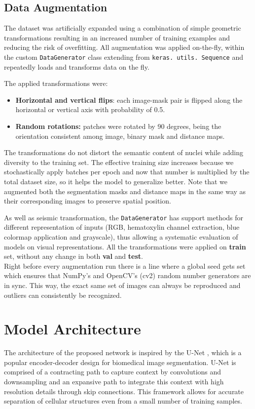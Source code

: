 \documentclass[target=bach,aauheader=,style=]{thud}
\begin{document}
\subsection{Data Augmentation}
The dataset was artificially expanded using a combination of simple geometric transformations resulting in an increased number of training examples and reducing the risk of overfitting.
All augmentation was applied on-the-fly, within the custom \texttt{DataGenerator} class extending from \texttt{keras. utils. Sequence} and repeatedly loads and transforms data on the fly.

The applied transformations were:
\begin{itemize}
\item \textbf{Horizontal and vertical flips}: each image-mask pair is flipped along the horizontal or vertical axis with probability of 0.5.
\item \textbf{Random rotations:} patches were rotated by 90 degrees, being the orientation consistent among image, binary mask and distance maps.
\end{itemize}

The transformations do not distort the semantic content of nuclei while adding diversity to the training set.
The effective training size increases because we stochastically apply batches per epoch and now that number is multiplied by the total dataset size, so it helps the model to generalize better.
Note that we augmented both the segmentation masks and distance maps in the same way as their corresponding images to preserve spatial position.

As well as seismic transformation, the \texttt{DataGenerator} has support methods for different representation of inputs (RGB, hematoxylin channel extraction, blue colormap application and grayscale), thus allowing a systematic evaluation of models on visual representations. All the transformations were applied on \textbf{train} set, without any change in both \textbf{val} and \textbf{test}. \\

Right before every augmentation run there is a line where a global seed gets set which ensures that NumPy’s and OpenCV’s (cv2) random number generators are in sync. This way, the exact same set of images can always be reproduced and outliers can consistently be recognized.
\section{Model Architecture}
\label{sec:model}
The architecture of the proposed network is inspired by the U-Net \cite{DBLP:journals/corr/RonnebergerFB15}, which is a popular encoder-decoder design for biomedical image segmentation.
U-Net is comprised of a contracting path to capture context by convolutions and downsampling and an expansive path to integrate this context with high resolution details through skip connections.
This framework allows for accurate separation of cellular structures even from a small number of training samples.
\end{document}
